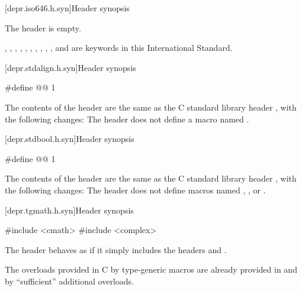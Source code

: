 [depr.iso646.h.syn]{Header  synopsis}

%
\pnum
The \Cpp{} header  is empty.
\begin{note}
,
,
,
,
,
,
,
,
,
, and
are keywords in this International Standard.
\end{note}

[depr.stdalign.h.syn]{Header  synopsis}

%
%
\begin{codeblock}
#define @@ 1
\end{codeblock}

\pnum
The contents of the \Cpp{} header  are the same as the C
standard library header , with the following changes:
The header  does not
define a macro named .


[depr.stdbool.h.syn]{Header  synopsis}

%
%
%
\begin{codeblock}
#define @@ 1
\end{codeblock}

\pnum
The contents of the \Cpp{} header  are the same as the C
standard library header , with the following changes:
The header  does not
define macros named , , or .


[depr.tgmath.h.syn]{Header  synopsis}

%
\begin{codeblock}
#include <cmath>
#include <complex>
\end{codeblock}

\pnum
The header 
behaves as if it simply includes the headers
 and
.

\pnum
\begin{note}
The overloads provided in C by type-generic macros
are already provided in  and 
by ``sufficient'' additional overloads.
\end{note}

